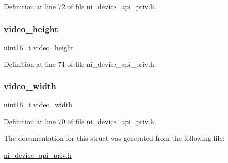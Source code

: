 Definition at line 72 of file ni\+\_\+device\+\_\+api\+\_\+priv.\+h.

\mbox{\label{struct__ni__encoder__frame__params_ae62d455c07515a709b2ccd014a29dd62}} 
\subsubsection{\texorpdfstring{video\_height}{video\_height}}
{\footnotesize\ttfamily uint16\+\_\+t video\+\_\+height}



Definition at line 71 of file ni\+\_\+device\+\_\+api\+\_\+priv.\+h.

\mbox{\label{struct__ni__encoder__frame__params_a7e13f7f50a6a67ac38b8a9057b677210}} 
\subsubsection{\texorpdfstring{video\_width}{video\_width}}
{\footnotesize\ttfamily uint16\+\_\+t video\+\_\+width}



Definition at line 70 of file ni\+\_\+device\+\_\+api\+\_\+priv.\+h.



The documentation for this struct was generated from the following file\+:\begin{DoxyCompactItemize}
\item 
\mbox{\hyperlink{ni__device__api__priv_8h}{ni\+\_\+device\+\_\+api\+\_\+priv.\+h}}\end{DoxyCompactItemize}
